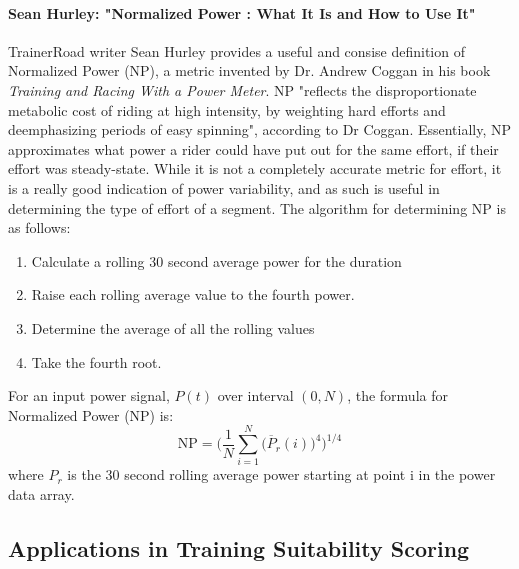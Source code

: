 \documentclass[11pt,twoside]{report}
\begin{document}
\paragraph{Sean Hurley: "Normalized Power \citep{Hurley2020}: What It Is and How to Use It"}
TrainerRoad writer Sean Hurley provides a useful and consise definition of Normalized Power (NP), a metric invented by Dr. Andrew Coggan in his book \textit{Training and Racing With a Power Meter}. NP
"reflects the disproportionate metabolic cost of riding at high intensity, by weighting hard efforts and deemphasizing periods of easy spinning", according to Dr Coggan.
Essentially, NP approximates what power a rider could have put out for the same effort, if their effort was steady-state. While it is not a completely accurate metric for effort, it is a really
good indication of power variability, and as such is useful in determining the type of effort of a segment. The algorithm for determining NP is as follows:
\begin{enumerate}
	\item Calculate a rolling 30 second average power for the duration
	\item Raise each rolling average value to the fourth power.
	\item Determine the average of all the rolling values
	\item Take the fourth root.
\end{enumerate}
For an input power signal, $P(t)$ over interval $(0,N)$, the formula for Normalized Power (NP) is:
\[
	\mathrm{NP} = \bigg( \frac{1}{N} \sum_{i=1}^{N}\big(\overline{P}_{r}(i)\big)^{4}\bigg)^{1/4}
\]
where $P_r$ is the 30 second rolling average power starting at point i in the power data array.
\subsection{Applications in Training Suitability Scoring}
\end{document}
